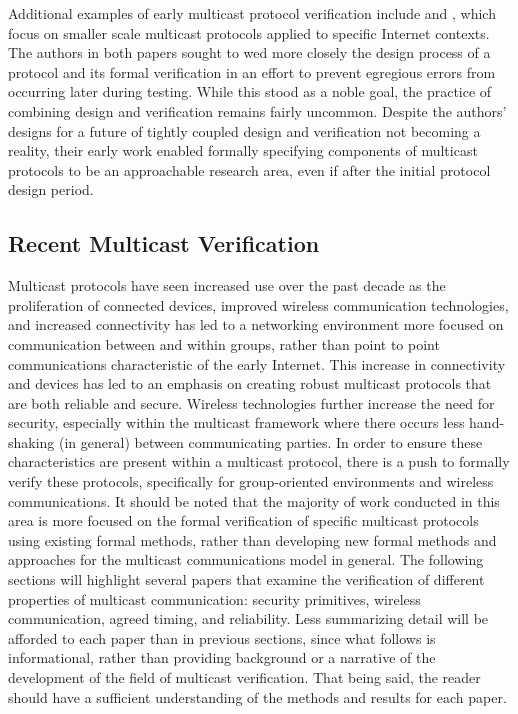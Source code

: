 \documentclass[11pt, journal]{IEEEtran}
\begin{document}
\bigbreak
Additional examples of early multicast protocol verification include \cite{Callahan1995} and \cite{Baptista1990}, which focus on smaller scale multicast protocols applied to specific Internet contexts. The authors in both papers sought to wed more closely the design process of a protocol and its formal verification in an effort to prevent egregious errors from occurring later during testing. While this stood as a noble goal, the practice of combining design and verification remains fairly uncommon. Despite the authors' designs for a future of tightly coupled design and verification not becoming a reality, their early work enabled formally specifying components of multicast protocols to be an approachable research area, even if after the initial protocol design period.
\bigbreak
\subsection{Recent Multicast Verification}
Multicast protocols have seen increased use over the past decade as the proliferation of connected devices, improved wireless communication technologies, and increased connectivity has led to a networking environment more focused on communication between and within groups, rather than point to point communications characteristic of the early Internet. This increase in connectivity and devices has led to an emphasis on creating robust multicast protocols that are both reliable and secure. Wireless technologies further increase the need for security, especially within the multicast framework where there occurs less hand-shaking (in general) between communicating parties. In order to ensure these characteristics are present within a multicast protocol, there is a push to formally verify these protocols, specifically for group-oriented environments and wireless communications. It should be noted that the majority of work conducted in this area is more focused on the formal verification of specific multicast protocols using existing formal methods, rather than developing new formal methods and approaches for the multicast communications model in general.
\bigbreak
The following sections will highlight several papers that examine the verification of different properties of multicast communication: security primitives, wireless communication, agreed timing, and reliability. Less summarizing detail will be afforded to each paper than in previous sections, since what follows is informational, rather than providing background or a narrative of the development of the field of multicast verification. That being said, the reader should have a sufficient understanding of the methods and results for each paper.
\bigbreak
\end{document}
